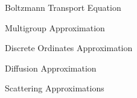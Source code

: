 \begin{frame}[t]{Boltzmann Transport Equation}
    
    

\end{frame}


\begin{frame}[t]{Multigroup Approximation}
    
    
    
\end{frame}


\begin{frame}[t]{Discrete Ordinates Approximation}
    
    
    
\end{frame}


\begin{frame}[t]{Diffusion Approximation}
    
    
    
\end{frame}


\begin{frame}[t]{Scattering Approximations}
    
    
    
\end{frame}